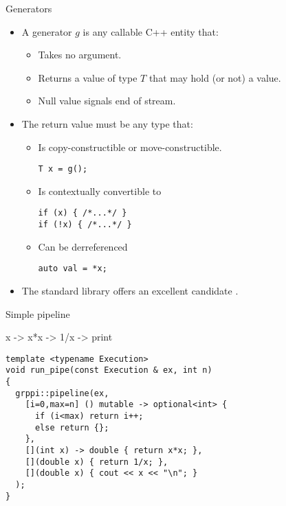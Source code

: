 \begin{frame}[t,fragile]{Generators}
\begin{itemize}
  \item A generator $g$ is any callable C++ entity that:
    \begin{itemize}
      \item Takes no argument.
      \item Returns a value of type $T$ that may hold (or not) a value.
      \item Null value signals end of stream.
    \end{itemize}

  \vfill\pause
  \item The return value must be any type that:
    \begin{itemize}
      \item Is copy-constructible or move-constructible.
\begin{lstlisting}
T x = g();
\end{lstlisting}
      \pause
      \item Is contextually convertible to 
\begin{lstlisting}
if (x) { /*...*/ }
if (!x) { /*...*/ }
\end{lstlisting}
      \pause
      \item Can be derreferenced
\begin{lstlisting}
auto val = *x;
\end{lstlisting}
    \end{itemize}
  \vfill\pause
  \item The standard library offers an excellent candidate .
\end{itemize}
\end{frame}

\begin{frame}[t,fragile]{Simple pipeline}
\begin{block}{x -> x*x -> 1/x -> print}
\begin{lstlisting}
template <typename Execution>
void run_pipe(const Execution & ex, int n)
{
  grppi::pipeline(ex,
    [i=0,max=n] () mutable -> optional<int> {
      if (i<max) return i++;
      else return {};
    },
    [](int x) -> double { return x*x; },
    [](double x) { return 1/x; },
    [](double x) { cout << x << "\n"; }
  );
}
\end{lstlisting}
\end{block}
\end{frame}

